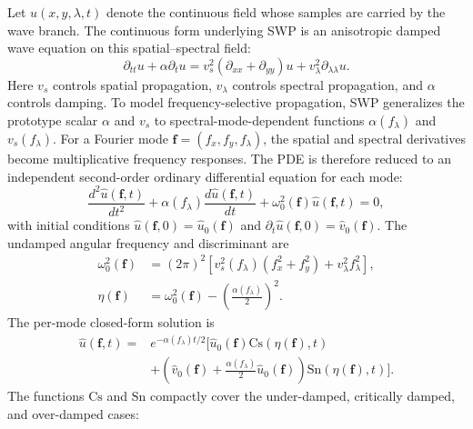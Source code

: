 \documentclass[letterpaper]{article} %
\newcommand{\swp}{\textsc{SWP}}
\newcommand{\Cs}{\mathrm{Cs}}
\newcommand{\Sn}{\mathrm{Sn}}
\begin{document}
Let \(u(x,y,\lambda,t)\) denote the continuous field whose samples are carried by the wave branch.
The continuous form underlying \swp{} is an anisotropic damped wave equation on this spatial--spectral field:
\begin{equation}
\partial_{tt}u+\alpha\partial_tu
=v_s^2(\partial_{xx}+\partial_{yy})u+v_\lambda^2\partial_{\lambda\lambda}u.
\label{eq:wave_pde}
\end{equation}
Here \(v_s\) controls spatial propagation, \(v_\lambda\) controls spectral propagation, and \(\alpha\) controls damping.
To model frequency-selective propagation, \swp{} generalizes the prototype scalar \(\alpha\) and \(v_s\) to spectral-mode-dependent functions \(\alpha(f_\lambda)\) and \(v_s(f_\lambda)\).
For a Fourier mode \(\boldsymbol f=(f_x,f_y,f_\lambda)\), the spatial and spectral derivatives become multiplicative frequency responses.
The PDE is therefore reduced to an independent second-order ordinary differential equation for each mode:
\begin{equation}
\frac{d^2\hat u(\boldsymbol f,t)}{dt^2}
+\alpha(f_\lambda)\frac{d\hat u(\boldsymbol f,t)}{dt}
+\omega_0^2(\boldsymbol f)\hat u(\boldsymbol f,t)=0,
\label{eq:mode_ode}
\end{equation}
with initial conditions \(\hat u(\boldsymbol f,0)=\hat u_0(\boldsymbol f)\) and \(\partial_t\hat u(\boldsymbol f,0)=\hat v_0(\boldsymbol f)\).
The undamped angular frequency and discriminant are
\begin{equation}
\begin{aligned}
\omega_0^2(\boldsymbol f)
&=(2\pi)^2\left[
 v_s^2(f_\lambda)(f_x^2+f_y^2)+v_\lambda^2 f_\lambda^2
\right], \\
\eta(\boldsymbol f)&=\omega_0^2(\boldsymbol f)-\left(\frac{\alpha(f_\lambda)}{2}\right)^2 .
\end{aligned}
\label{eq:omega}
\end{equation}
The per-mode closed-form solution is
\begin{equation}
\begin{aligned}
\hat u(\boldsymbol f,t)=
&e^{-\alpha(f_\lambda)t/2}
\Big[
\hat u_0(\boldsymbol f)\Cs(\eta(\boldsymbol f),t) \\
&+\left(\hat v_0(\boldsymbol f)
+\frac{\alpha(f_\lambda)}{2}\hat u_0(\boldsymbol f)\right)
\Sn(\eta(\boldsymbol f),t)
\Big].
\end{aligned}
\label{eq:closed_form}
\end{equation}
The functions \(\Cs\) and \(\Sn\) compactly cover the under-damped, critically damped, and over-damped cases:
\end{document}
